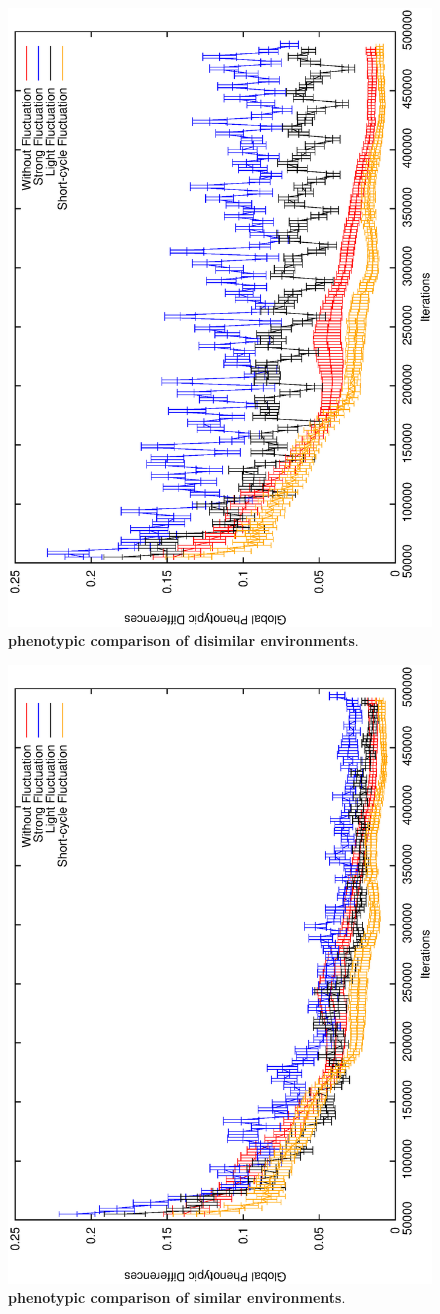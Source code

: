 \begin{figure}[h]
\centering
\includegraphics[width=0.7\columnwidth, angle =-90 ]{img/diffProp}
\caption{\textbf{phenotypic comparison of disimilar environments}.}
\label{fig:disimilar}
\end{figure}

\begin{figure}[h]
\centering
\includegraphics[width=0.7\columnwidth, angle =-90 ]{img/ProgressProp}
\caption{\textbf{phenotypic comparison of similar environments}.}
\label{fig:similar}
\end{figure}

